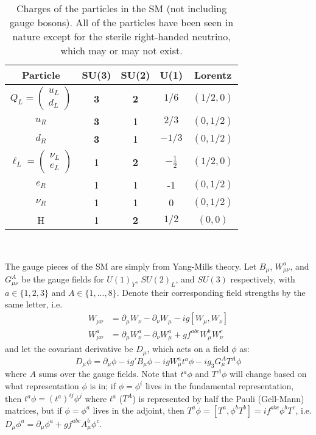 \documentclass[11pt, oneside]{article}   	%
\theoremstyle{definition}
\begin{document}
\begin{table}[H]
	\centering
	\begin{tabular}{ | c | c | c | c | c | }
		\hline
		Particle & SU(3) & SU(2) & U(1) & Lorentz \\
		\hline
		$Q_L = \begin{pmatrix} u_L \\ d_L \end{pmatrix}$ & \textbf{3} & \textbf{2} & $1/6$ & $(1/2, 0)$ \\
		\hline
		$u_R$ & \textbf{3} & 1 & $2/3$ & $(0, 1/2)$ \\
		\hline
		$d_R$ & \textbf{3} & 1 & $-1/3$ & $(0, 1/2)$ \\
		\hline
		$\ell_L = \begin{pmatrix} \nu_L \\ e_L \end{pmatrix}$ & 1 & \textbf{2} & $-\frac{1}{2}$ & $(1/2, 0)$ \\
		\hline
		$e_R$ & 1 & 1 & -1 &  $(0, 1/2)$ \\
		\hline
		$\nu_R$ & 1 & 1 & 0 & $(0, 1/2)$ \\
		\hline
		H & 1 & \textbf{2} & $1/2$ & $(0, 0)$ \\ 
		\hline
	\end{tabular}
	\caption{Charges of the particles in the SM (not including gauge bosons). All of the particles have been 
	seen in nature except for the sterile right-handed neutrino, which may or may not exist. }~
	\label{table:charges}
\end{table}

The gauge pieces of the SM are simply from Yang-Mills theory. Let $B_{\mu}$, $W_{\mu\nu}^a$, and $G_{\mu\nu}^A$ be the 
gauge fields for $U(1)_Y$, $SU(2)_L$, and $SU(3)$ respectively, with $a \in \{1, 2, 3\}$ and $A\in \{1, ..., 8\}$. Denote their 
corresponding field strengths by the same letter, i.e. 
\begin{align}
	W_{\mu\nu} &= \partial_\mu W_{\nu} - \partial_\nu W_\mu - i g [W_\mu, W_\nu] \\
	W_{\mu\nu}^a &= \partial_\mu W_\nu^a - \partial_\nu W_\mu^a + g f^{abc} W_\mu^b W_\nu^c
\end{align}
and let the covariant derivative be $D_\mu$, which acts on a field $\phi$ as:
\begin{equation}
	D_\mu\phi = \partial_\mu\phi - ig' B_\mu \phi - ig W_\mu^a t^a \phi - ig_3 G_\mu^A T^A\phi
\end{equation}
where $A$ sums over the gauge fields. Note that $t^a \phi$ and $T^A\phi$ will change based on what representation $\phi$ 
is in; if $\phi = \phi^i$ lives in the fundamental representation, then $t^a\phi = (t^a)^{ij}\phi^j$ where $t^a$ ($T^A$) is 
represented by half the Pauli (Gell-Mann) matrices, but if $\phi = \phi^a$ lives in the adjoint, then $T^a \phi = [T^a, \phi^b T^b] 
= if^{abc} \phi^bT^c$, i.e. $D_\mu\phi^a = \partial_\mu\phi^a + g f^{abc} A_\mu^b \phi^c$. 
\end{document}
